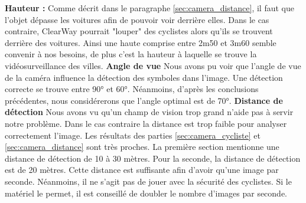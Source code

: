 \textbf{Hauteur :}
\newline
Comme décrit dans le paragraphe \ref{sec:camera_distance}, il faut que l'objet dépasse les voitures afin de pouvoir voir derrière elles. 
Dans le cas contraire, ClearWay pourrait "louper" des cyclistes alors qu'ils se trouvent derrière des voitures.
Ainsi une haute comprise entre 2m50 et 3m60 semble convenir à nos besoins, de plus c'est la hauteur à laquelle se trouve la vidéosurveillance des villes.
\newline \newline
\textbf{Angle de vue}
\newline
Nous avons pu voir que l'angle de vue de la caméra influence la détection des symboles dans l'image. Une détection correcte se trouve entre 90° et 60°.
Néanmoins, d'après les conclusions précédentes, nous considérerons que l'angle optimal est de 70°.\newline\newline
\textbf{Distance de détection}
\newline
Nous avons vu qu'un champ de vision trop grand n'aide pas à servir notre problème. Dans le cas contraire la distance est trop faible pour analyser correctement l'image.
Les résultats des parties \ref{sec:camera_cycliste} et \ref{sec:camera_distance} sont très proches.
La première section mentionne une distance de détection de 10 à 30 mètres. Pour la seconde, la distance de détection est de 20 mètres. 
Cette distance est suffisante afin d'avoir qu'une image par seconde. Néanmoins, il ne s'agit pas de jouer avec la sécurité des cyclistes. 
Si le matériel le permet, il est conseillé de doubler le nombre d'images par seconde.